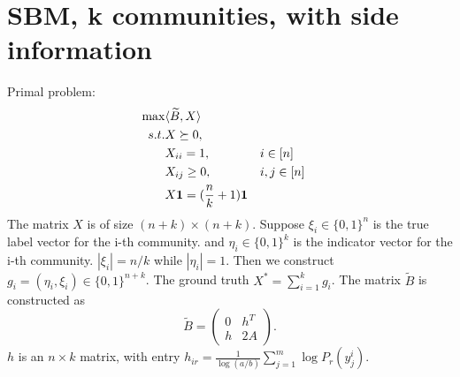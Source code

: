 \documentclass{ctexart}
\begin{document}
\section{SBM, k communities, with side information}
Primal problem:
\begin{align}
\max & \langle \widetilde{B},X \rangle \notag \\
s.t. & X \succeq 0, \notag\\
&X_{ii} = 1,  && i \in [n] \notag\\
&X_{ij} \geq 0, && i,j \in [n] \notag\\
&X \mathbf{1} = (\frac{n}{k}+1)\mathbf{1} \label{eq:AZ_ext}
\end{align}
The matrix $X$ is of size $(n+k) \times (n+k)$.
Suppose $\xi_i \in \{0,1\}^n $ is the true label vector for the i-th community.
and $\eta_i \in \{0,1\}^k$ is the indicator vector for the i-th community.
$|\xi_i|=n/k$ while $|\eta_i|=1$. Then we construct $g_i=(\eta_i, \xi_i)
\in \{0,1\}^{n+k}$.
The ground truth $X^*=\sum_{i=1}^k g_i$.
The matrix $\widetilde{B}$ is constructed as
\begin{equation}\label{eq:B_lambda_def}
	\widetilde{B} = \begin{pmatrix} 0 & h^T  \\ h  & 2A \end{pmatrix}.
\end{equation}
$h$ is an $n\times k$ matrix, with entry $h_{ir} = \frac{1}{\log(a/b)}
\sum_{j=1}^m \log P_r(y^i_{j})$.


	
\end{document}
